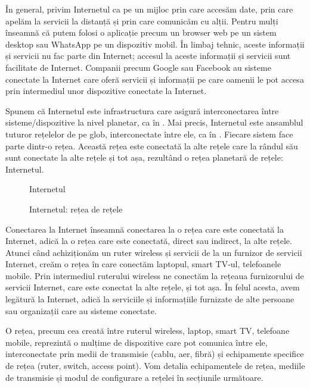 În general, privim Internetul ca pe un mijloc prin care accesăm date, prin care apelăm la servicii la distanță și prin care comunicăm cu alții.
Pentru mulți înseamnă că putem folosi o aplicație precum un browser web pe un sistem desktop sau WhatsApp pe un dispozitiv mobil.
În limbaj tehnic, aceste informații și servicii nu fac parte din Internet;
accesul la aceste informații și servicii sunt facilitate de Internet.
Companii precum Google sau Facebook au sisteme conectate la Internet care oferă servicii și informații pe care oamenii le pot accesa prin intermediul unor dispozitive conectate la Internet.

Spunem că Internetul este infrastructura care asigură interconectarea între sisteme/dispozitive la nivel planetar, ca în .
Mai precis, Internetul este ansamblul tuturor rețelelor de pe glob, interconectate între ele, ca în .
Fiecare sistem face parte dintr-o rețea.
Această rețea este conectată la alte rețele care la rândul său sunt conectate la alte rețele și tot așa, rezultând o rețea planetară de rețele: Internetul.

\begin{figure}[htbp]
  \centering
  \def\svgwidth{\columnwidth}
  
  \caption{Internetul}
  \label{fig:net:internet}
\end{figure}

\begin{figure}[htbp]
  \centering
  \def\svgwidth{\columnwidth}
  
  \caption{Internetul: rețea de rețele}
  \label{fig:net:internet-as-network}
\end{figure}

Conectarea la Internet înseamnă conectarea la o rețea care este conectată la Internet, adică la o rețea care este conectată, direct sau indirect, la alte rețele.
Atunci când achiziționăm un ruter wireless și servicii de la un furnizor de servicii Internet, creăm o rețea în care conectăm laptopul, smart TV-ul, telefoanele mobile.
Prin intermediul ruterului wireless ne conectăm la rețeaua furnizorului de servicii Internet, care este conectat la alte rețele, și tot așa.
În felul acesta, avem legătură la Internet, adică la serviciile și informațiile furnizate de alte persoane sau organizații care au sisteme conectate.

O rețea, precum cea creată între ruterul wireless, laptop, smart TV, telefoane mobile, reprezintă o mulțime de dispozitive care pot comunica între ele, interconectate prin medii de transmisie (cablu, aer, fibră) și echipamente specifice de rețea (ruter, switch, access point).
Vom detalia echipamentele de rețea, mediile de transmisie și modul de configurare a rețelei în secțiunile următoare.

